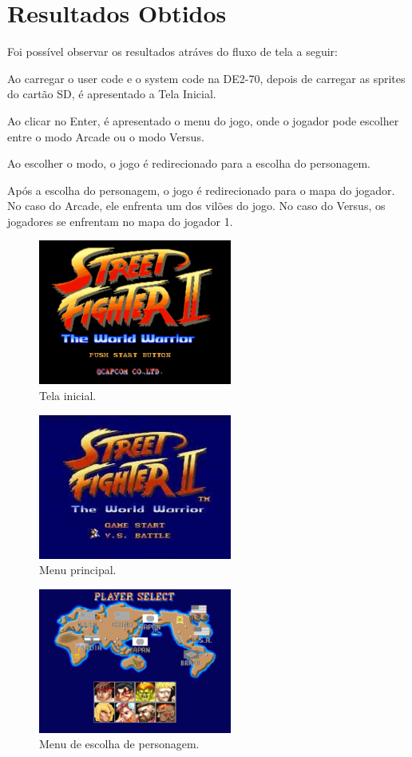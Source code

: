 \documentclass{vgtc}                          %
\begin{document}
\section{Resultados Obtidos}

Foi possível observar os resultados atráves do fluxo de tela a seguir:

Ao carregar o user code e o system code na DE2-70, depois de carregar as sprites do cartão SD, é apresentado a Tela Inicial.

Ao clicar no Enter, é apresentado o menu do jogo, onde o jogador pode escolher entre o modo Arcade ou o modo Versus.

Ao escolher o modo, o jogo é redirecionado para a escolha do personagem.

Após a escolha do personagem, o jogo é redirecionado para o mapa do jogador. No caso do Arcade, ele enfrenta um dos vilões do jogo. No caso do Versus, os jogadores se enfrentam no mapa do jogador 1.


\begin{figure}[htbp]
  \centering
  \includegraphics[width=2.5in]{abertura.png}
 \caption{Tela inicial.}
\end{figure}

\begin{figure}[htbp]
  \centering
  \includegraphics[width=2.5in]{versus.png}
 \caption{Menu principal.}
\end{figure}

\begin{figure}[htbp]
  \centering
  \includegraphics[width=2.5in]{select_vs.png}
 \caption{Menu de escolha de personagem.}
\end{figure}
\end{document}

